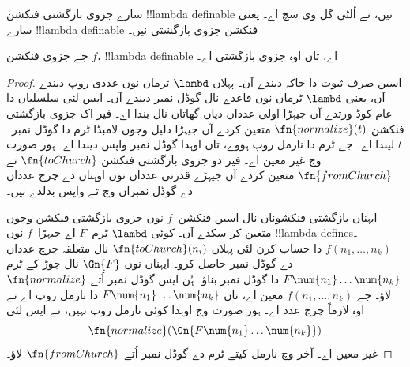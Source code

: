 \documentclass[../../../include/open-logic-section]{subfiles}
\begin{document}

سارے جزوی بازگشتی فنکشن !!{lambda definable} نیں، تے اُلٹی گل
وی سچ اے۔ یعنی سارے !!{lambda definable} فنکشن جزوی بازگشتی
نیں۔

\begin{thm}
   جے جزوی فنکشن $f$،
  !!{lambda definable} اے، تاں اوہ جزوی بازگشتی اے۔
\end{thm}

\begin{proof}
  اسیں صرف ثبوت دا خاکہ دیندے آں۔ پہلاں $\lambd$-ٹرماں نوں
  عددی روپ دیندے آں، یعنی $\lambd$-ٹرماں نوں قاعدے نال گوڈل
  نمبر دیندے آں۔ ایس لئی سلسلیاں دا عام کوڈ ورتدے آں جیہڑا
  اولی عدداں دیاں گھاتاں نال بندا اے۔ فیر اک جزوی بازگشتی
  فنکشن $\fn{normalize}(t)$ متعین کردے آں جیہڑا دلیل وجوں
  لامبڈا ٹرم دا گوڈل نمبر~$t$ لیندا اے۔ جے ٹرم دا نارمل روپ
  ہووے، تاں اوہدا گوڈل نمبر واپس دیندا اے۔ ہور صورت وچ
  غیر معین اے۔ فیر دو جزوی بازگشتی فنکشن $\fn{toChurch}$
  تے $\fn{fromChurch}$ متعین کردے آں جیہڑے قدرتی عدداں
  نوں اوہناں دے چرچ عدداں دے گوڈل نمبراں وچ تے واپس بدلدے نیں۔

  ایہناں بازگشتی فنکشوناں نال اسیں فنکشن~$f$ نوں جزوی بازگشتی
  فنکشن وجوں متعین کر سکدے آں۔ کوئی $\lambd$-ٹرم~$F$ اے
  جیہڑا~$f$ نوں !!{lambda define}s۔ $f(n_1, \dots, n_k)$ دا
  حساب کرن لئی پہلاں $\fn{toChurch}(n_i)$ نال متعلقہ چرچ
  عدداں دے گوڈل نمبر حاصل کرو۔ ایہناں نوں $\Gn{F}$ نال
  جوڑ کے ٹرم $F \num{n_1}\dots\num{n_k}$ دا گوڈل نمبر بناؤ۔
  ہُن ایس گوڈل نمبر اُتے $\fn{normalize}$ لاؤ۔ جے
  $f(n_1, \dots, n_k)$ معین اے، تاں $F \num{n_1}\dots\num{n_k}$
  دا نارمل روپ اے تے اوہ لازماً چرچ عدد اے۔ ہور صورت وچ
  اوہدا کوئی نارمل روپ نہیں، تے ایس لئی
  \[\fn{normalize}(\Gn{F\num{n_1}\dots\num{n_k}})\]
  غیر معین اے۔ آخر وچ نارمل کیتے ٹرم دے گوڈل نمبر اُتے
  $\fn{fromChurch}$ لاؤ۔
\end{proof}
\end{document}

